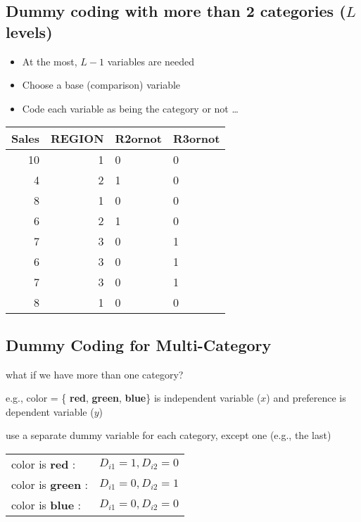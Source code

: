 \documentclass[10pt,article]{article}
\begin{document}
\subsection{Dummy coding with more than 2 categories (\(L\) levels)}
\label{sec:org37eafcd}
\begin{multicols}{2}
\begin{itemize}
\item At the most, \(L-1\) variables are needed
\item Choose a base (comparison) variable
\item Code each variable as being the category or not \ldots{}
\end{itemize}

{\small
\begin{center}
\begin{tabular}{rrll}
Sales & REGION & R2ornot & R3ornot\\
\hline
10 & 1 &  0 &  0\\
4 & 2 &  1 &  0\\
8 & 1 &  0 &  0\\
6 & 2 &  1 &  0\\
7 & 3 &  0 &  1\\
6 & 3 &  0 &  1\\
7 & 3 &  0 &  1\\
8 & 1 &  0 &  0\\
\end{tabular}
\end{center}
}

\end{multicols}
\subsection{Dummy Coding for Multi-Category}
\label{sec:org213c770}
what if we have more than one category?

e.g., color = \{ {\bf red},  {\bf green},
 {\bf blue}\} is independent variable (\(x\)) and preference is
dependent variable (\(y\))

use a separate dummy variable for each category, except one (e.g., the last)

\begin{center}
\begin{tabular}{ll}
color is  {\bf red} : & \(D_{i1} = 1, D_{i2} = 0\)\\
color is  {\bf green} : & \(D_{i1} = 0, D_{i2} = 1\)\\
color is  {\bf blue} : & \(D_{i1} = 0, D_{i2} = 0\)\\
\end{tabular}
\end{center}
\end{document}
